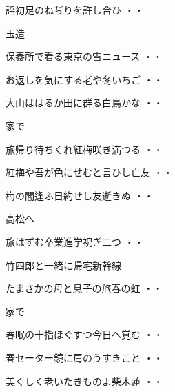 \vspace{0.6cm}
\begin{shiika}謡初足のねぢりを許し合ひ
\hfill{・・}\end{shiika}
\vspace{0.6cm}
玉造
\begin{shiika}保養所で看る東京の雪ニュース
\hfill{・・}\end{shiika}
\begin{shiika}お返しを気にする老や冬いちご
\hfill{・・}\end{shiika}
\begin{shiika}大山ははるか田に群る白鳥かな
\hfill{・・}\end{shiika}
\vspace{0.6cm}
家で
\begin{shiika}旅帰り待ちくれ紅梅咲き満つる
\hfill{・・}\end{shiika}
\begin{shiika}紅梅や吾が色にせむと言ひし亡友
\hfill{・・}\end{shiika}
\begin{shiika}梅の闇逢ふ日約せし友逝きぬ
\hfill{・・}\end{shiika}
\vspace{0.6cm}
高松へ
\begin{shiika}旅はずむ卒業進学祝ぎ二つ
\hfill{・・}\end{shiika}
\vspace{0.6cm}
竹四郎と一緒に帰宅新幹線
\begin{shiika}たまさかの母と息子の旅春の虹
\hfill{・・}\end{shiika}
\vspace{0.6cm}
家で
\begin{shiika}春眠の十指ほぐすつ今日へ覚む
\hfill{・・}\end{shiika}
\vspace{0.6cm}
\begin{shiika}春セーター鏡に肩のうすきこと
\hfill{・・}\end{shiika}
\vspace{0.6cm}
\begin{shiika}美くしく老いたきものよ柴木蓮
\hfill{・・}\end{shiika}
